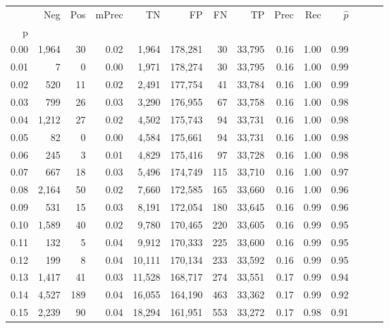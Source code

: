 \begin{tabular}{rrrrrrrrrrrrrr}
\toprule
{} &     Neg &    Pos & mPrec &       TN &       FP &      FN &      TP &  Prec &   Rec & $\hat{p}$ \\
p    &         &        &       &          &          &         &         &       &       &           \\
\midrule
0.00 &   1,964 &     30 &  0.02 &    1,964 &  178,281 &      30 &  33,795 &  0.16 &  1.00 &      0.99 \\
0.01 &       7 &      0 &  0.00 &    1,971 &  178,274 &      30 &  33,795 &  0.16 &  1.00 &      0.99 \\
0.02 &     520 &     11 &  0.02 &    2,491 &  177,754 &      41 &  33,784 &  0.16 &  1.00 &      0.99 \\
0.03 &     799 &     26 &  0.03 &    3,290 &  176,955 &      67 &  33,758 &  0.16 &  1.00 &      0.98 \\
0.04 &   1,212 &     27 &  0.02 &    4,502 &  175,743 &      94 &  33,731 &  0.16 &  1.00 &      0.98 \\
0.05 &      82 &      0 &  0.00 &    4,584 &  175,661 &      94 &  33,731 &  0.16 &  1.00 &      0.98 \\
0.06 &     245 &      3 &  0.01 &    4,829 &  175,416 &      97 &  33,728 &  0.16 &  1.00 &      0.98 \\
0.07 &     667 &     18 &  0.03 &    5,496 &  174,749 &     115 &  33,710 &  0.16 &  1.00 &      0.97 \\
0.08 &   2,164 &     50 &  0.02 &    7,660 &  172,585 &     165 &  33,660 &  0.16 &  1.00 &      0.96 \\
0.09 &     531 &     15 &  0.03 &    8,191 &  172,054 &     180 &  33,645 &  0.16 &  0.99 &      0.96 \\
0.10 &   1,589 &     40 &  0.02 &    9,780 &  170,465 &     220 &  33,605 &  0.16 &  0.99 &      0.95 \\
0.11 &     132 &      5 &  0.04 &    9,912 &  170,333 &     225 &  33,600 &  0.16 &  0.99 &      0.95 \\
0.12 &     199 &      8 &  0.04 &   10,111 &  170,134 &     233 &  33,592 &  0.16 &  0.99 &      0.95 \\
0.13 &   1,417 &     41 &  0.03 &   11,528 &  168,717 &     274 &  33,551 &  0.17 &  0.99 &      0.94 \\
0.14 &   4,527 &    189 &  0.04 &   16,055 &  164,190 &     463 &  33,362 &  0.17 &  0.99 &      0.92 \\
0.15 &   2,239 &     90 &  0.04 &   18,294 &  161,951 &     553 &  33,272 &  0.17 &  0.98 &      0.91 \\

\end{tabular}

